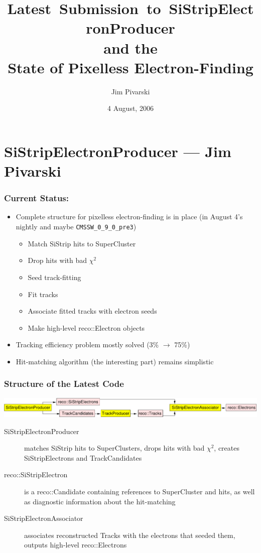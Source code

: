 \documentclass[12pt,compress]{beamer}
\title{\mbox{Latest Submission to SiStripElectronProducer} \\ and the \\ State of Pixelless Electron-Finding}
\author{Jim Pivarski}
\institute{Cornell University}
\date{4 August, 2006}
\begin{document}
\addtocounter{page}{-1}
\frame{\titlepage}
\section*{SiStripElectronProducer --- Jim Pivarski}

\begin{frame}
\frametitle{Current Status:}
\begin{itemize}\setlength{\itemsep}{0.25 cm}
\item Complete structure for pixelless electron-finding is in place (in August 4's nightly and maybe {\tt CMSSW\_0\_9\_0\_pre3})
\begin{itemize}
\item Match SiStrip hits to SuperCluster
\item Drop hits with bad $\chi^2$
\item Seed track-fitting
\item Fit tracks
\item Associate fitted tracks with electron seeds
\item Make high-level reco::Electron objects
\end{itemize}

\item Tracking efficiency problem mostly solved (3\% $\longrightarrow$ 75\%)

\item Hit-matching algorithm (the interesting part) remains simplistic
\end{itemize}
\end{frame}

\begin{frame}
\frametitle{Structure of the Latest Code}
\includegraphics[width=\linewidth]{SiStripElectron_path}

\vfill
\begin{minipage}{\linewidth}
\small
\begin{description}
\item[SiStripElectronProducer] matches SiStrip hits to SuperClusters,
drops hits with bad $\chi^2$, creates SiStripElectrons and
TrackCandidates
\item[reco::SiStripElectron] is a reco::Candidate containing references
to SuperCluster and hits, as well as diagnostic information about the
hit-matching
\item[SiStripElectronAssociator] associates reconstructed Tracks with
the electrons that seeded them, outputs high-level reco::Electrons
\end{description}
\end{minipage}
\end{frame}
\end{document}
